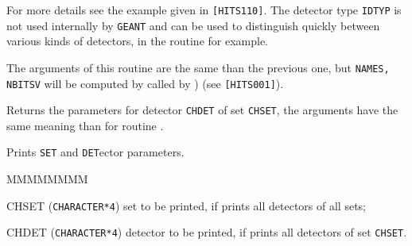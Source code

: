 For more details see the example given in {\tt [HITS110]}.
The detector type {\tt IDTYP} is not used internally by {\tt GEANT}
and can be used to distinguish quickly between various
kinds of detectors, in the routine  for example.

The arguments of this routine are the same than the previous one,
but {\tt NAMES, NBITSV} will be computed by  called by
) (see {\tt [HITS001]}).

Returns the parameters for detector {\tt CHDET} of set {\tt CHSET}, the
arguments have the same meaning than for routine .

Prints {\tt SET} and {\tt DET}ector parameters.
\begin{DLtt}{MMMMMMMM}
\item[CHSET] ({\tt CHARACTER*4}) set to be printed, if {\tt *} prints 
all detectors of all sets;
\item[CHDET] ({\tt CHARACTER*4}) detector to be printed, if {\tt *} prints
all detectors of set {\tt CHSET}.
\end{DLtt}
 
